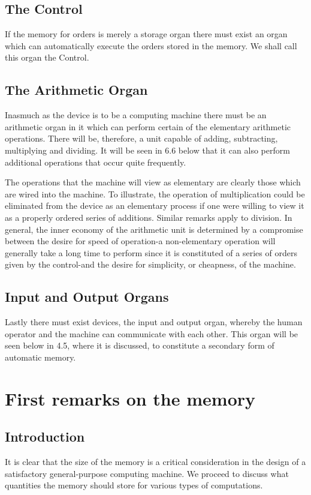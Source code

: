 \documentclass[12pt]{amsart}
\begin{document}
\subsection{The Control}
If the memory for orders is merely a storage organ there must exist an organ which can automatically execute the orders stored in the memory. We shall call this organ the Control.

\subsection{The Arithmetic Organ}
Inasmuch as the device is to be a computing machine there must be an arithmetic organ in it which can perform certain of the elementary arithmetic operations. There will be, therefore, a unit capable of adding, subtracting, multiplying and dividing. It will be seen in 6.6 below that it can also perform additional operations that occur quite frequently.

The operations that the machine will view as elementary are clearly those which are wired into the machine. To illustrate, the operation of multiplication could be eliminated from the device as an elementary process if one were willing to view it as a properly ordered series of additions. Similar remarks apply to division. In general, the inner economy of the arithmetic unit is determined by a compromise between the desire for speed of operation-a non-elementary operation will generally take a long time to perform since it is constituted of a series of orders given by the control-and the desire for simplicity, or cheapness, of the machine.

\subsection{Input and Output Organs}
Lastly there must exist devices, the input and output organ, whereby the human operator and the machine can communicate with each other. This organ will be seen below in 4.5, where it is discussed, to constitute a secondary form of automatic memory.

\section{First remarks on the memory}

\subsection{Introduction}
It is clear that the size of the memory is a critical consideration in the design of a satisfactory general-purpose computing machine. We proceed to discuss what quantities the memory should store for various types of computations.
\end{document}
